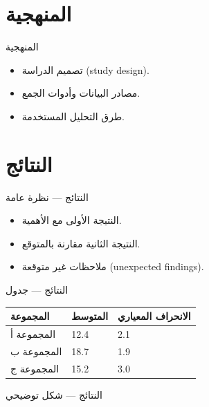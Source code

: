 \documentclass[aspectratio=169,11pt]{beamer}
\let\textEN\textenglish
\begin{document}
\section{المنهجية}
\begin{frame}{المنهجية}
\begin{itemize}
  \item تصميم الدراسة \textEN{(study design)}.
  \item مصادر البيانات وأدوات الجمع.
  \item طرق التحليل المستخدمة.
\end{itemize}
\end{frame}

\section{النتائج}
\begin{frame}{النتائج — نظرة عامة}
\begin{itemize}
  \item النتيجة الأولى مع الأهمية.
  \item النتيجة الثانية مقارنة بالمتوقع.
  \item ملاحظات غير متوقعة \textEN{(unexpected findings)}.
\end{itemize}
\end{frame}

\begin{frame}{النتائج — جدول}
\begin{table}[h]
\centering
\begin{tabularx}{0.85\textwidth}{lXX}
\toprule
المجموعة & المتوسط & الانحراف المعياري \\
\midrule
المجموعة أ & 12.4 & 2.1 \\
المجموعة ب & 18.7 & 1.9 \\
المجموعة ج & 15.2 & 3.0 \\
\bottomrule
\end{tabularx}
\end{table}
\end{frame}

\begin{frame}{النتائج — شكل توضيحي}
\begin{center}
\end{center}
\end{frame}
\end{document}
